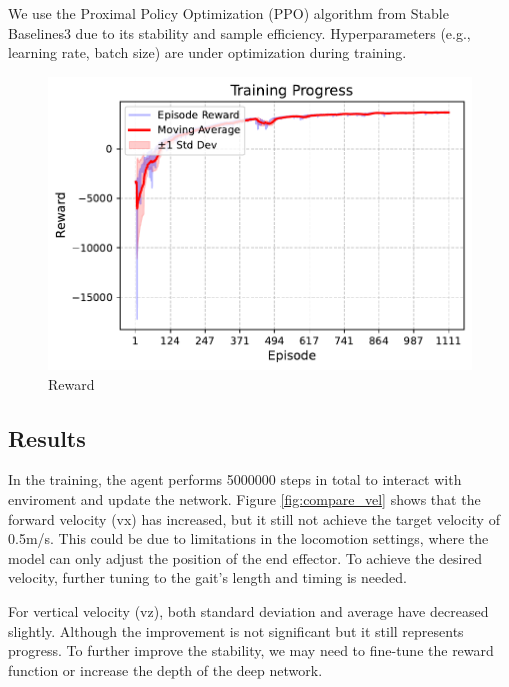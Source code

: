 \documentclass[a4paper,11pt]{article}
\begin{document}
We use the Proximal Policy Optimization (PPO) algorithm from Stable Baselines3 due to its stability and sample efficiency.
Hyperparameters (e.g., learning rate, batch size) are under optimization during training.

\begin{figure}[H]
  \centering
	\includegraphics[width=0.5\linewidth]{../../assets/rl_training_progress.pdf}
  \caption{Reward}
  \label{fig:reward}
\end{figure}

\subsection{Results}

In the training, the agent performs 5000000 steps in total to interact with enviroment and update the network. 
Figure \ref{fig:compare_vel} shows that the forward velocity (vx) has increased, but it still not achieve the target velocity of 0.5m/s.
This could be due to limitations in the locomotion settings, where the model can only adjust the position of the end effector. To achieve the desired velocity, 
further tuning to the gait's length and timing is needed.

For vertical velocity (vz), both standard deviation and average have decreased slightly. Although the improvement is not significant but it still represents progress.
To further improve the stability, we may need to fine-tune the reward function or increase the depth of the deep network.
\end{document}
